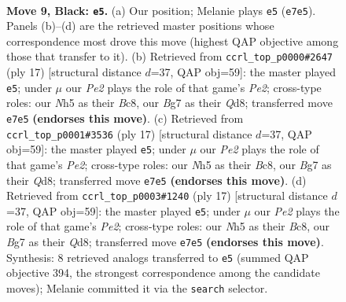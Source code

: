 \documentclass[11pt]{article}
\begin{document}
\clearpage

\begin{figure}[p]\centering
\begin{subfigure}{0.46\textwidth}\centering
\resizebox{\linewidth}{!}{%
\newchessgame
\chessboard[
  setfen={1rbq1rk1/pp1pppbp/2n3p1/2p4n/2P4P/4PNP1/PP1P1PB1/RNBQ1RK1 b - - 0 9},
  showmover=false,
  pgfstyle=straightmove, color=movearrow, markmove={e7-e5}
]}
\caption{}
\end{subfigure}\hfill
\begin{subfigure}{0.46\textwidth}\centering
\resizebox{\linewidth}{!}{%
\newchessgame
\chessboard[
  setfen={r1bq1rk1/ppp1ppbp/1nn3p1/8/3P4/2N1PNP1/PP3PBP/R1BQ1RK1 b - - 0 9},
  showmover=false,
  pgfstyle=straightmove, color=movearrow, markmove={e7-e5}
]}
\caption{}
\end{subfigure}
\\[4pt]
\begin{subfigure}{0.46\textwidth}\centering
\resizebox{\linewidth}{!}{%
\newchessgame
\chessboard[
  setfen={r1bq1rk1/ppp1ppbp/1nn3p1/8/3P4/2N1PNP1/PP3PBP/R1BQ1RK1 b - - 0 9},
  showmover=false,
  pgfstyle=straightmove, color=movearrow, markmove={e7-e5}
]}
\caption{}
\end{subfigure}\hfill
\begin{subfigure}{0.46\textwidth}\centering
\resizebox{\linewidth}{!}{%
\newchessgame
\chessboard[
  setfen={r1bq1rk1/ppp1ppbp/1nn3p1/8/3P4/2N1PNP1/PP3PBP/R1BQ1RK1 b - - 0 9},
  showmover=false,
  pgfstyle=straightmove, color=movearrow, markmove={e7-e5}
]}
\caption{}
\end{subfigure}
\caption{\textbf{Move 9, Black: \texttt{e5}.} (a) Our position; Melanie plays \texttt{e5} (\texttt{e7e5}). Panels (b)--(d) are the retrieved master positions whose correspondence most drove this move (highest QAP objective among those that transfer to it). (b) Retrieved from \texttt{ccrl\_top\_p0000\#2647} (ply 17) [structural distance $d$=37, QAP obj=59]: the master played \texttt{e5}; under $\mu$ our \emph{Pe2} plays the role of that game's \emph{Pe2}; cross-type roles: our \emph{N}h5 as their \emph{B}c8, our \emph{B}g7 as their \emph{Q}d8; transferred move \texttt{e7e5} \textbf{(endorses this move)}. (c) Retrieved from \texttt{ccrl\_top\_p0001\#3536} (ply 17) [structural distance $d$=37, QAP obj=59]: the master played \texttt{e5}; under $\mu$ our \emph{Pe2} plays the role of that game's \emph{Pe2}; cross-type roles: our \emph{N}h5 as their \emph{B}c8, our \emph{B}g7 as their \emph{Q}d8; transferred move \texttt{e7e5} \textbf{(endorses this move)}. (d) Retrieved from \texttt{ccrl\_top\_p0003\#1240} (ply 17) [structural distance $d$=37, QAP obj=59]: the master played \texttt{e5}; under $\mu$ our \emph{Pe2} plays the role of that game's \emph{Pe2}; cross-type roles: our \emph{N}h5 as their \emph{B}c8, our \emph{B}g7 as their \emph{Q}d8; transferred move \texttt{e7e5} \textbf{(endorses this move)}. Synthesis: 8 retrieved analogs transferred to \texttt{e5} (summed QAP objective 394, the strongest correspondence among the candidate moves); Melanie committed it via the \texttt{search} selector.}
\label{fig:thought-m17}
\end{figure}
\end{document}
